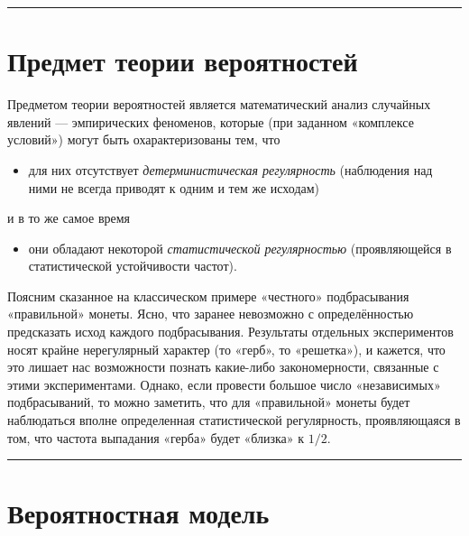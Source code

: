\documentclass[11pt,a4paper]{article}
\providecommand{\tightlist}{%
      \setlength{\itemsep}{0pt}\setlength{\parskip}{0pt}}
\begin{document}
    \begin{center}\rule{0.5\linewidth}{0.5pt}\end{center}

    \hypertarget{ux43fux440ux435ux434ux43cux435ux442-ux442ux435ux43eux440ux438ux438-ux432ux435ux440ux43eux44fux442ux43dux43eux441ux442ux435ux439}{%
\section{Предмет теории
вероятностей}\label{ux43fux440ux435ux434ux43cux435ux442-ux442ux435ux43eux440ux438ux438-ux432ux435ux440ux43eux44fux442ux43dux43eux441ux442ux435ux439}}

Предметом теории вероятностей является математический анализ случайных
явлений --- эмпирических феноменов, которые (при заданном «комплексе
условий») могут быть охарактеризованы тем, что

\begin{itemize}
\tightlist
\item
  для них отсутствует \emph{детерминистическая регулярность} (наблюдения
  над ними не всегда приводят к одним и тем же исходам)
\end{itemize}

и в то же самое время

\begin{itemize}
\tightlist
\item
  они обладают некоторой \emph{статистической регулярностью}
  (проявляющейся в статистической устойчивости частот).
\end{itemize}

Поясним сказанное на классическом примере «честного» подбрасывания
«правильной» монеты. Ясно, что заранее невозможно с определённостью
предсказать исход каждого подбрасывания. Результаты отдельных
экспериментов носят крайне нерегулярный характер (то «герб», то
«решетка»), и кажется, что это лишает нас возможности познать какие-либо
закономерности, связанные с этими экспериментами. Однако, если провести
большое число «независимых» подбрасываний, то можно заметить, что для
«правильной» монеты будет наблюдаться вполне определенная статистической
регулярность, проявляющаяся в том, что частота выпадания «герба» будет
«близка» к \(1/2\).

    \begin{center}\rule{0.5\linewidth}{0.5pt}\end{center}

    \hypertarget{ux432ux435ux440ux43eux44fux442ux43dux43eux441ux442ux43dux430ux44f-ux43cux43eux434ux435ux43bux44c}{%
\section{Вероятностная
модель}\label{ux432ux435ux440ux43eux44fux442ux43dux43eux441ux442ux43dux430ux44f-ux43cux43eux434ux435ux43bux44c}}
\end{document}
